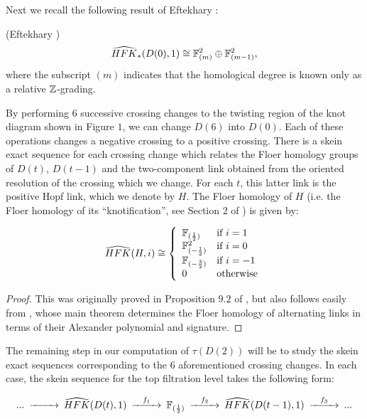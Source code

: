 \bigskip
\noindent Next we recall the following result of Eftekhary \cite{Eaman}:




\begin{theorem} 
	\label{thm:D0} (Eftekhary \cite{Eaman})
	$$\widehat{HFK}_*(D(0),1) \cong  \mathbb F^2_{(m)}\oplus \mathbb F^2_{(m-1)},$$ where the subscript $(m)$ indicates that the homological degree is known only as a relative $\mathbb{Z}$-grading.
\end{theorem}


By performing $6$ successive crossing changes to the twisting region of the knot diagram shown in Figure $1$, we can change $D(6)$ into $D(0)$.  Each of these operations changes a negative crossing to a positive crossing.   There is a skein exact sequence for each crossing change which relates the Floer homology groups of $D(t)$, $D(t-1)$ and the two-component link obtained from the oriented resolution of the crossing which we change.  For each $t$, this latter link is the positive Hopf link, which we denote by $H$.  The Floer homology of $H$ (i.e. the Floer homology of its ``knotification'', see Section $2$ of \cite{Knots}) is given by:

\begin{prop}
\label{prop:H}


$$\HFKa(H,i)\cong
\left\{\begin{array}{ll}

\F_{(\OneHalf)} & {\text{if $i=1$}} \\
\F^2_{(-\OneHalf)} & {\text{if $i=0$}} \\
\F_{(-\frac{3}{2})} & {\text{if $i=-1$}} \\
0 & {\text{otherwise}} \\
\end{array}
\right. $$

\end{prop}
\begin{proof} This was originally proved in Proposition $9.2$ of \cite{Knots}, but also follows easily from \cite{AltKnots}, whose main theorem determines the Floer homology of alternating links in terms of their Alexander polynomial and signature.
\end{proof}

The remaining step in our computation of $\tau(D(2))$ will be to study the skein exact sequences corresponding to the $6$ aforementioned crossing changes.  In each case, the skein sequence for the top filtration level takes the following form:

$$
\begin{CD}
	... @>>>	\HFKa(D(t),1)
	@>{f_1}>> \F_{(\OneHalf)} @>{f_2}>> 	 \HFKa(D(t-1),1)  @>{f_3}>>...
\end{CD}
$$

